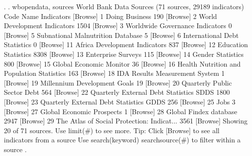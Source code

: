 . 
. wbopendata, sources
{\smallskip}
World Bank Data Sources (71 sources, 29189 indicators)
  Code  Name                                         Indicators  [Browse]
     1  Doing Business                                      190  [Browse]
     2  World Development Indicators                       1504  [Browse]
     3  Worldwide Governance Indicators                       0  [Browse]
     5  Subnational Malnutrition Database                     5  [Browse]
     6  International Debt Statistics                         0  [Browse]
    11  Africa Development Indicators                       837  [Browse]
    12  Education Statistics                               8308  [Browse]
    13  Enterprise Surveys                                  115  [Browse]
    14  Gender Statistics                                   800  [Browse]
    15  Global Economic Monitor                              36  [Browse]
    16  Health Nutrition and Population Statistics          163  [Browse]
    18  IDA Results Measurement System                        1  [Browse]
    19  Millennium Development Goals                         19  [Browse]
    20  Quarterly Public Sector Debt                        564  [Browse]
    22  Quarterly External Debt Statistics SDDS            1800  [Browse]
    23  Quarterly External Debt Statistics GDDS             256  [Browse]
    25  Jobs                                                  3  [Browse]
    27  Global Economic Prospects                             1  [Browse]
    28  Global Findex database                             2947  [Browse]
    29  The Atlas of Social Protection: Indicat...         3561  [Browse]
Showing 20 of 71 sources. Use limit(\#) to see more.
{\smallskip}
Tip: Click [Browse] to see all indicators from a source
     Use search(keyword) searchsource(\#) to filter within a source
{\smallskip}
. 
